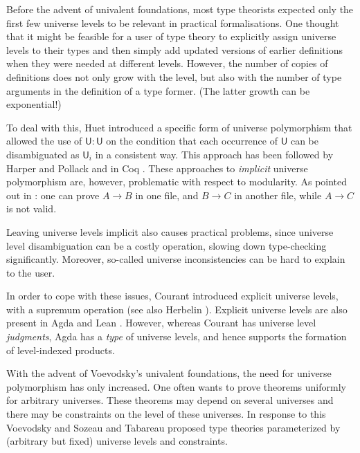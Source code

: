 \documentclass[a4paper,UKenglish,cleveref, autoref, thm-restate]{lipics-v2021}
\newcommand{\UU}{\mathsf{U}}
\begin{document}
Before the advent of univalent foundations, most type theorists expected
only the first few universe levels to be relevant in practical formalisations.
One thought that it might be feasible for a user of
type theory to explicitly assign universe levels to their types and
then simply add updated versions of earlier
definitions when they were needed at different levels.
However, the number of copies of definitions does not only grow with the level,
but also with the number of type arguments in the definition of a type former.
(The latter growth can be exponential!)

To deal with this, Huet \cite{Huet87} introduced a specific form of
universe polymorphism that allowed the use of $\UU:\UU$
on the condition that each occurrence of $\UU$ can be disambiguated
as $\UU_i$ in a consistent way.
This approach has been followed by Harper and Pollack \cite{HarperP91} and
in Coq \cite{coq:general}.
These  approaches to \emph{implicit} universe polymorphism are, however,
problematic with respect to modularity. As pointed out in \cite{Courant02,Simpson04}:
one can prove $A\rightarrow B$ in one file, and $B\rightarrow C$ in
another file, while $A\rightarrow C$ is not valid.

Leaving universe levels implicit also causes practical problems,
since universe level disambiguation can be a costly operation,
slowing down type-checking significantly.
Moreover, so-called universe inconsistencies can be hard to explain to the user.

In order to cope with these issues, Courant \cite{Courant02}
introduced explicit universe levels,
with a supremum operation (see also Herbelin \cite{herbelin05}).
Explicit universe levels are also present in Agda \cite{agda-manual} and
Lean \cite{moura:lean,Carneiro19}.
However, whereas Courant has
universe level \emph{judgments}, Agda has a \emph{type} of
universe levels, and hence supports the formation of level-indexed products.

With the advent of Voevodsky's univalent foundations,
the need for universe polymorphism has only increased.
One often wants to prove theorems uniformly for arbitrary universes. These theorems may depend on several universes and there may be constraints on the level of these universes.
In response to this Voevodsky  \cite{VV} and Sozeau and Tabareau \cite{SozeauTabareau:coq} proposed type theories parameterized by
(arbitrary but fixed) universe levels and constraints.
\end{document}
